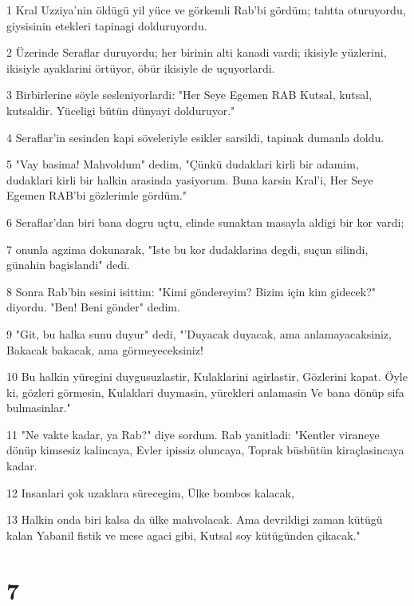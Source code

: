 \par 1 Kral Uzziya'nin öldügü yil yüce ve görkemli Rab'bi gördüm; tahtta oturuyordu, giysisinin etekleri tapinagi dolduruyordu.
\par 2 Üzerinde Seraflar duruyordu; her birinin alti kanadi vardi; ikisiyle yüzlerini, ikisiyle ayaklarini örtüyor, öbür ikisiyle de uçuyorlardi.
\par 3 Birbirlerine söyle sesleniyorlardi: "Her Seye Egemen RAB Kutsal, kutsal, kutsaldir. Yüceligi bütün dünyayi dolduruyor."
\par 4 Seraflar'in sesinden kapi söveleriyle esikler sarsildi, tapinak dumanla doldu.
\par 5 "Vay basima! Mahvoldum" dedim, "Çünkü dudaklari kirli bir adamim, dudaklari kirli bir halkin arasinda yasiyorum. Buna karsin Kral'i, Her Seye Egemen RAB'bi gözlerimle gördüm."
\par 6 Seraflar'dan biri bana dogru uçtu, elinde sunaktan masayla aldigi bir kor vardi;
\par 7 onunla agzima dokunarak, "Iste bu kor dudaklarina degdi, suçun silindi, günahin bagislandi" dedi.
\par 8 Sonra Rab'bin sesini isittim: "Kimi göndereyim? Bizim için kim gidecek?" diyordu. "Ben! Beni gönder" dedim.
\par 9 "Git, bu halka sunu duyur" dedi, "'Duyacak duyacak, ama anlamayacaksiniz, Bakacak bakacak, ama görmeyeceksiniz!
\par 10 Bu halkin yüregini duygusuzlastir, Kulaklarini agirlastir, Gözlerini kapat. Öyle ki, gözleri görmesin, Kulaklari duymasin, yürekleri anlamasin Ve bana dönüp sifa bulmasinlar."
\par 11 "Ne vakte kadar, ya Rab?" diye sordum. Rab yanitladi: "Kentler viraneye dönüp kimsesiz kalincaya, Evler ipissiz oluncaya, Toprak büsbütün kiraçlasincaya kadar.
\par 12 Insanlari çok uzaklara sürecegim, Ülke bombos kalacak,
\par 13 Halkin onda biri kalsa da ülke mahvolacak. Ama devrildigi zaman kütügü kalan Yabanil fistik ve mese agaci gibi, Kutsal soy kütügünden çikacak."

\chapter{7}

